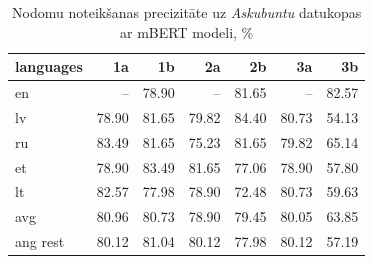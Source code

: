 \begin{table}[htbp]
  \centering
  \caption{Nodomu noteikšanas precizitāte uz \textit{Askubuntu} datukopas ar mBERT modeli, \%}
    \begin{tabular}{lrrrrrr} \toprule
    languages & 1a & 1b & 2a & 2b & 3a & 3b \\\midrule
    en    &  --   & \cellcolor[rgb]{ .984,  .965,  .976}78.90 &   --  & \cellcolor[rgb]{ .737,  .812,  .914}81.65 &  --   & \cellcolor[rgb]{ .608,  .722,  .867}82.57 \\
    lv    & \cellcolor[rgb]{ .984,  .965,  .976}78.90 & \cellcolor[rgb]{ .737,  .812,  .914}81.65 & \cellcolor[rgb]{ .988,  .988,  1}79.82 & \cellcolor[rgb]{ .353,  .541,  .776}84.40 & \cellcolor[rgb]{ .863,  .902,  .957}80.73 & \cellcolor[rgb]{ .973,  .412,  .42}54.13 \\
    ru    & \cellcolor[rgb]{ .482,  .631,  .824}83.49 & \cellcolor[rgb]{ .737,  .812,  .914}81.65 & \cellcolor[rgb]{ .984,  .882,  .894}75.23 & \cellcolor[rgb]{ .737,  .812,  .914}81.65 & \cellcolor[rgb]{ .988,  .988,  1}79.82 & \cellcolor[rgb]{ .976,  .655,  .667}65.14 \\
    et    & \cellcolor[rgb]{ .984,  .965,  .976}78.90 & \cellcolor[rgb]{ .482,  .631,  .824}83.49 & \cellcolor[rgb]{ .737,  .812,  .914}81.65 & \cellcolor[rgb]{ .984,  .925,  .937}77.06 & \cellcolor[rgb]{ .984,  .965,  .976}78.90 & \cellcolor[rgb]{ .973,  .494,  .502}57.80 \\
    lt    & \cellcolor[rgb]{ .608,  .722,  .867}82.57 & \cellcolor[rgb]{ .984,  .945,  .957}77.98 & \cellcolor[rgb]{ .984,  .965,  .976}78.90 & \cellcolor[rgb]{ .98,  .824,  .831}72.48 & \cellcolor[rgb]{ .863,  .902,  .957}80.73 & \cellcolor[rgb]{ .973,  .533,  .541}59.63 \\\bottomrule
    avg   & 80.96 & 80.73 & 78.90 & 79.45 & 80.05 & 63.85 \\
    ang rest & 80.12 & 81.04 & 80.12 & 77.98 & 80.12 & 57.19 \\
    \end{tabular}%
  \label{tab:askubuntu-bert}%
\end{table}%


